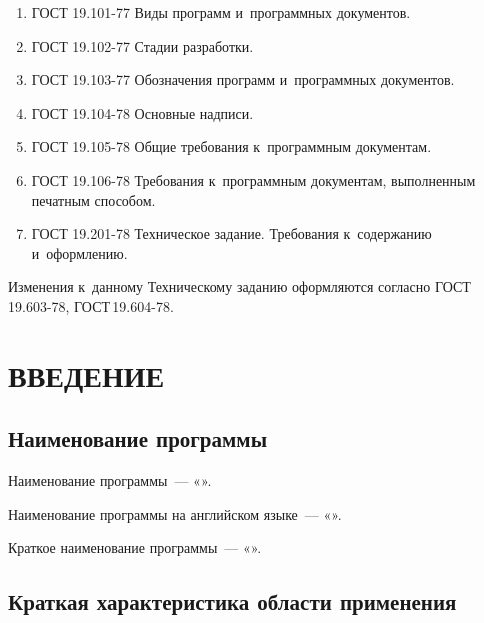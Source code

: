\documentclass[12pt,a4paper]{extarticle}
\begin{document}
\begin{enumerate}[label=\arabic*), leftmargin=1.25cm]
\item ГОСТ 19.101-77 Виды программ и~программных документов\cite{gost19101}.
\item ГОСТ 19.102-77 Стадии разработки\cite{gost19102}.
\item ГОСТ 19.103-77 Обозначения программ и~программных документов\cite{gost19103}.
\item ГОСТ 19.104-78 Основные надписи\cite{gost19104}.
\item ГОСТ 19.105-78 Общие требования к~программным документам\cite{gost19105}.
\item ГОСТ 19.106-78 Требования к~программным документам, выполненным печатным способом\cite{gost19106}.
\item ГОСТ 19.201-78 Техническое задание. Требования к~содержанию и~оформлению\cite{gost19201}.
\end{enumerate}

Изменения к~данному Техническому заданию оформляются согласно ГОСТ\,19.603-78\cite{gost19603}, ГОСТ\,19.604-78\cite{gost19604}.

\clearpage

\hypersetup{linkcolor=black}
\tableofcontents
\hypersetup{linkcolor=blue}
\thispagestyle{fancy}
\clearpage

\section{ВВЕДЕНИЕ}

\subsection{Наименование программы}

Наименование программы~--- «\projectname».

Наименование программы на английском языке~--- «\hseProjectNameEn».

Краткое наименование программы~--- «\hseProjectNameShort».

\subsection{Краткая характеристика области применения}
\end{document}

